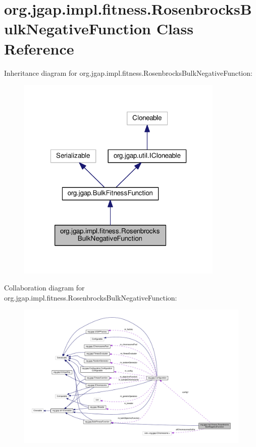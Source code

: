 \hypertarget{classorg_1_1jgap_1_1impl_1_1fitness_1_1_rosenbrocks_bulk_negative_function}{\section{org.\-jgap.\-impl.\-fitness.\-Rosenbrocks\-Bulk\-Negative\-Function Class Reference}
\label{classorg_1_1jgap_1_1impl_1_1fitness_1_1_rosenbrocks_bulk_negative_function}
}


Inheritance diagram for org.\-jgap.\-impl.\-fitness.\-Rosenbrocks\-Bulk\-Negative\-Function\-:
\nopagebreak
\begin{figure}[H]
\begin{center}
\leavevmode
\includegraphics[width=280pt]{classorg_1_1jgap_1_1impl_1_1fitness_1_1_rosenbrocks_bulk_negative_function__inherit__graph}
\end{center}
\end{figure}


Collaboration diagram for org.\-jgap.\-impl.\-fitness.\-Rosenbrocks\-Bulk\-Negative\-Function\-:
\nopagebreak
\begin{figure}[H]
\begin{center}
\leavevmode
\includegraphics[width=350pt]{classorg_1_1jgap_1_1impl_1_1fitness_1_1_rosenbrocks_bulk_negative_function__coll__graph}
\end{center}
\end{figure}
